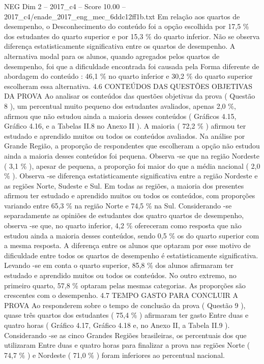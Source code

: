 \begin{textsample}{NEG Dim 2 – 2017\_c4 – Score 10.00 – 2017\_c4/enade\_2017\_eng\_mec\_6ddc12ff1b.txt}
Em relação aos quartos de desempenho, o Desconhecimento do conteúdo foi a opção escolhida por 17,5 \% dos estudantes do quarto superior e por 15,3 \% do quarto inferior.
Não se observa diferença estatisticamente significativa entre os quartos de desempenho.
A alternativa modal para os alunos, quando agregados pelos quartos de desempenho, foi que a dificuldade encontrada foi causada pela Forma diferente de abordagem do conteúdo : 46,1 \% no quarto inferior e 30,2 \% do quarto superior escolheram essa alternativa. 4.6 CONTEÚDOS DAS QUESTÕES OBJETIVAS DA PROVA Ao analisar os conteúdos das questões objetivas da prova ( Questão 8 ), um percentual muito pequeno dos estudantes avaliados, apenas 2,0 \%, afirmou que não estudou ainda a maioria desses conteúdos ( Gráficos 4.15, Gráfico 4.16, e a Tabelas II.8 no Anexo II ).
A maioria ( 72,2 \% ) afirmou ter estudado e aprendido muitos ou todos os conteúdos avaliados.
Na análise por Grande Região, a proporção de respondentes que escolheram a opção não estudou ainda a maioria desses conteúdos foi pequena.
Observa -se que na região Nordeste ( 3,1 \% ), apesar de pequena, a proporção foi maior do que a média nacional ( 2,0 \% ).
Observa -se diferença estatisticamente significativa entre a região Nordeste e as regiões Norte, Sudeste e Sul.
Em todas as regiões, a maioria dos presentes afirmou ter estudado e aprendido muitos ou todos os conteúdos, com proporções variando entre 65,3 \% na região Norte e 74,5 \% na Sul.
Considerando -se separadamente as opiniões de estudantes dos quatro quartos de desempenho, observa -se que, no quarto inferior, 4,2 \% ofereceram como resposta que não estudou ainda a maioria desses conteúdos, sendo 0,5 \% os do quarto superior com a mesma resposta.
A diferença entre os alunos que optaram por esse motivo de dificuldade entre todos os quartos de desempenho é estatisticamente significativa.
Levando -se em conta o quarto superior, 85,8 \% dos alunos afirmaram ter estudado e aprendido muitos ou todos os conteúdos.
No outro extremo, no primeiro quarto, 57,8 \% optaram pelas mesmas categorias.
As proporções são crescentes com o desempenho. 4.7 TEMPO GASTO PARA CONCLUIR A PROVA Ao responderem sobre o tempo de conclusão da prova ( Questão 9 ), quase três quartos dos estudantes ( 75,4 \% ) afirmaram ter gasto Entre duas e quatro horas ( Gráfico 4.17, Gráfico 4.18 e, no Anexo II, a Tabela II.9 ).
Considerando -se as cinco Grandes Regiões brasileiras, os percentuais dos que utilizaram Entre duas e quatro horas para finalizar a prova nas regiões Norte ( 74,7 \% ) e Nordeste ( 71,0 \% ) foram inferiores ao percentual nacional.

\end{textsample}
